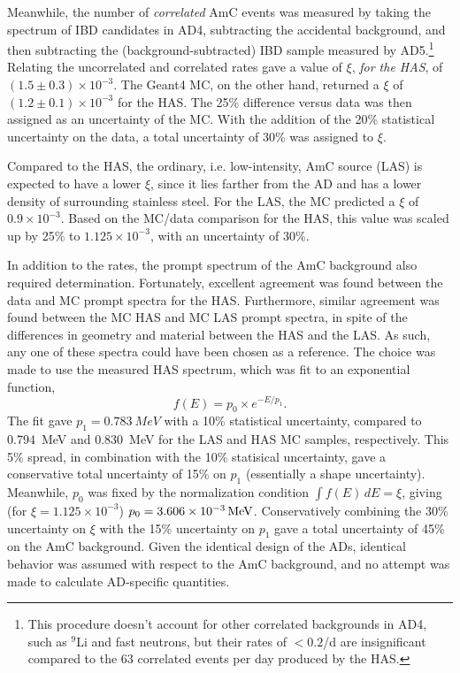 \documentclass[../thesis.tex]{subfiles}
\begin{document}
Meanwhile, the number of \emph{correlated} AmC events was measured by taking the spectrum of IBD candidates in AD4, subtracting the accidental background, and then subtracting the (background-subtracted) IBD sample measured by AD5.\footnote{This procedure doesn't account for other correlated backgrounds in AD4, such as $^9$Li and fast neutrons, but their rates of $< 0.2$/d are insignificant compared to the 63 correlated events per day produced by the HAS.} Relating the uncorrelated and correlated rates gave a value of $\xi$, \emph{for the HAS}, of $(1.5\pm0.3)\times10^{-3}$. The Geant4 MC, on the other hand, returned a $\xi$ of $(1.2\pm0.1)\times10^{-3}$ for the HAS. The 25\% difference versus data was then assigned as an uncertainty of the MC. With the addition of the 20\% statistical uncertainty on the data, a total uncertainty of 30\% was assigned to $\xi$.

Compared to the HAS, the ordinary, i.e. low-intensity, AmC source (LAS) is expected to have a lower $\xi$, since it lies farther from the AD and has a lower density of surrounding stainless steel. For the LAS, the MC predicted a $\xi$ of $0.9\times10^{-3}$. Based on the MC/data comparison for the HAS, this value was scaled up by 25\% to $1.125\times10^{-3}$, with an uncertainty of 30\%. 

In addition to the rates, the prompt spectrum of the AmC background also required determination. Fortunately, excellent agreement was found between the data and MC prompt spectra for the HAS. Furthermore, similar agreement was found between the MC HAS and MC LAS prompt spectra, in spite of the differences in geometry and material between the HAS and the LAS. As such, any one of these spectra could have been chosen as a reference. The choice was made to use the measured HAS spectrum, which was fit to an exponential function,
\begin{equation*}
  f(E) = p_0 \times e^{-E/p_1}.
\end{equation*}
The fit gave $p_1 = \SI{0.783}{MeV}$ with a 10\% statistical uncertainty, compared to \SI{0.794}{MeV} and \SI{0.830}{MeV} for the LAS and HAS MC samples, respectively. This 5\% spread, in combination with the 10\% statisical uncertainty, gave a conservative total uncertainty of 15\% on $p_1$ (essentially a shape uncertainty). Meanwhile, $p_0$ was fixed by the normalization condition $\int f(E)\,dE = \xi$, giving (for $\xi = 1.125\times10^{-3}$) $p_0 = \SI[parse-numbers = false]{3.606\times10^{-3}}{/MeV}$. Conservatively combining the 30\% uncertainty on $\xi$ with the 15\% uncertainty on $p_1$ gave a total uncertainty of 45\% on the AmC background. Given the identical design of the ADs, identical behavior was assumed with respect to the AmC background, and no attempt was made to calculate AD-specific quantities.
\end{document}
